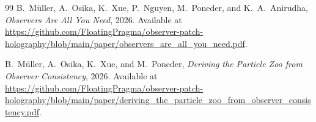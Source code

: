\documentclass[11pt]{article}
\begin{document}
\appendix


\begin{thebibliography}{99}
B.~M\"uller, A.~Osika, K.~Xue, P.~Nguyen, M.~Poneder, and K.~A.~Anirudha,
\emph{Observers Are All You Need},
2026.
Available at \url{https://github.com/FloatingPragma/observer-patch-holography/blob/main/paper/observers_are_all_you_need.pdf}.

B.~M\"uller, A.~Osika, K.~Xue, and M.~Poneder,
\emph{Deriving the Particle Zoo from Observer Consistency},
2026.
Available at \url{https://github.com/FloatingPragma/observer-patch-holography/blob/main/paper/deriving_the_particle_zoo_from_observer_consistency.pdf}.


\end{thebibliography}
\end{document}
